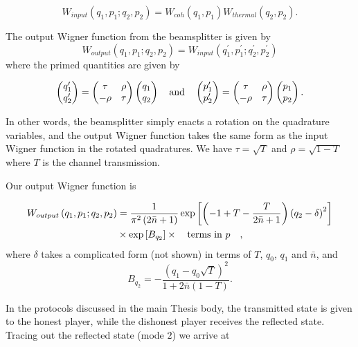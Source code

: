 \begin{equation}
W_{input}\left(q_1, p_1 ; q_2, p_2\right) = W_{coh}\left(q_1, p_1\right) W_{thermal}\left(q_2, p_2\right).
\end{equation}

\noindent The output Wigner function from the beamsplitter is given by
\begin{equation}
W_{output}\left(q_1, p_1 ; q_2, p_2\right) = W_{input}\left(q_1^\prime, p_1^\prime ; q_2^\prime, p_2^\prime \right)
\end{equation}
where the primed quantities are given by

\begin{equation}
\pmqty{q_1^\prime \\ q_2^\prime} = \pmqty{\tau & \rho \\ - \rho & \tau} \pmqty{q_1 \\ q_2} \qq{and} \pmqty{p_1^\prime \\ p_2^\prime} = \pmqty{\tau & \rho \\ - \rho & \tau} \pmqty{p_1 \\ p_2}.
\end{equation}

\noindent In other words, the beamsplitter simply enacts a rotation on the quadrature variables, and the output Wigner function takes the same form as the input Wigner function in the rotated quadratures. We have $\tau = \sqrt{T}$ and $\rho = \sqrt{1-T}$ where $T$ is the channel transmission.

Our output Wigner function is

\begin{align}
W_{output}\left(q_1, p_1; q_2, p_2\right) &= \frac{1}{\pi^2 \left(2 \bar{n}+1\right)} \exp\left[ \left(-1 + T  - \frac{T}{2 \bar{n} 
+1}\right) \left(q_2 - \delta\right)^2 \right]   \notag \\
%
&\times \exp\left[B_{q_2} \right] \times \qq{terms in $p$},
\end{align}
where $\delta$ takes a complicated form (not shown) in terms of $T$, $q_0$, $q_1$ and $\bar{n}$, and 
\begin{equation}
B_{q_2} = -\frac{\left(q_1 - q_0 \sqrt{T}\right)^2}{1 + 2 \bar{n} \left(1-T\right)}.
\end{equation}

\noindent In the protocols discussed in the main Thesis body, the transmitted state is given to the honest player, while the dishonest player receives the reflected state. Tracing out the reflected state (mode $2$) we arrive at

